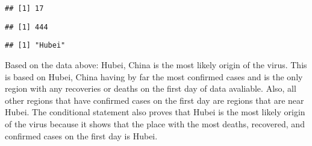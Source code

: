 \documentclass[
]{article}
\newenvironment{Shaded}{\begin{snugshade}}{\end{snugshade}}
\newcommand{\CommentTok}[1]{\textcolor[rgb]{0.56,0.35,0.01}{\textit{#1}}}
\newcommand{\ControlFlowTok}[1]{\textcolor[rgb]{0.13,0.29,0.53}{\textbf{#1}}}
\newcommand{\FloatTok}[1]{\textcolor[rgb]{0.00,0.00,0.81}{#1}}
\newcommand{\FunctionTok}[1]{\textcolor[rgb]{0.00,0.00,0.00}{#1}}
\newcommand{\NormalTok}[1]{#1}
\newcommand{\OtherTok}[1]{\textcolor[rgb]{0.56,0.35,0.01}{#1}}
\newcommand{\SpecialCharTok}[1]{\textcolor[rgb]{0.00,0.00,0.00}{#1}}
\begin{document}
\begin{verbatim}
## [1] 17
\end{verbatim}

\begin{Shaded}
\end{Shaded}

\begin{verbatim}
## [1] 444
\end{verbatim}

\begin{Shaded}
\end{Shaded}

\begin{verbatim}
## [1] "Hubei"
\end{verbatim}

Based on the data above: Hubei, China is the most likely origin of the
virus. This is based on Hubei, China having by far the most confirmed
cases and is the only region with any recoveries or deaths on the first
day of data avaliable. Also, all other regions that have confirmed cases
on the first day are regions that are near Hubei. The conditional
statement also proves that Hubei is the most likely origin of the virus
because it shows that the place with the most deaths, recovered, and
confirmed cases on the first day is Hubei.
\end{document}
